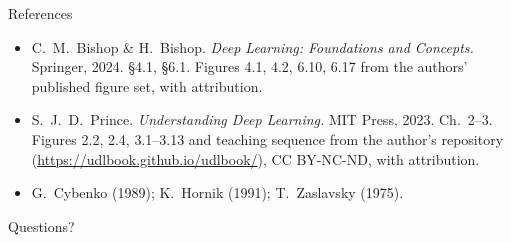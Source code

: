\documentclass[aspectratio=169, 11pt]{beamer}
\begin{document}
\begin{frame}{References}
  \footnotesize
  \begin{itemize}
    \item C.~M.~Bishop \& H.~Bishop. \textit{Deep
          Learning: Foundations and Concepts.} Springer,
          2024. \S4.1, \S6.1. Figures 4.1, 4.2, 6.10,
          6.17 from the authors' published figure set,
          with attribution.
    \item S.~J.~D.~Prince. \textit{Understanding Deep
          Learning.} MIT Press, 2023. Ch.~2--3. Figures
          2.2, 2.4, 3.1--3.13 and teaching sequence from
          the author's repository
          (\url{https://udlbook.github.io/udlbook/}),
          CC BY-NC-ND, with attribution.
    \item G.~Cybenko (1989); K.~Hornik (1991);
          T.~Zaslavsky (1975).
  \end{itemize}
\end{frame}

\begin{frame}[standout]
  Questions?
\end{frame}
\end{document}
